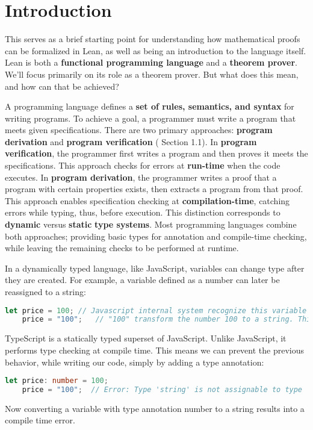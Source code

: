 \section{Introduction}
This serves as a brief starting point for understanding how mathematical proofs can be 
formalized in Lean, as well as being an introduction to the language itself. 
Lean is both a \textbf{functional programming language} and a \textbf{theorem prover}.
We'll focus primarily on its role as a theorem prover. 
But what does this mean, and how can that be achieved?

A programming language defines a \textbf{set of rules, semantics, and syntax} for writing programs. 
To achieve a goal, a programmer must write a program that meets given specifications. 
There are two primary approaches: \textbf{program derivation} and \textbf{program verification} 
(\cite{nordstrom1990programming} Section 1.1).
In \textbf{program verification}, the programmer first writes a program and then proves it meets 
the specifications. This approach checks for errors at \textbf{run-time} when the code executes.
In \textbf{program derivation}, the programmer writes a proof that a program with certain properties exists, 
then extracts a program from that proof. This approach enables specification 
checking at \textbf{compilation-time}, catching errors while typing, thus, before execution.
This distinction corresponds to \textbf{dynamic} versus \textbf{static} \textbf{type systems}. 
Most programming languages combine both approaches; providing basic types for annotation and compile-time checking, 
while leaving the remaining checks to be performed at runtime.

\begin{example}
    In a dynamically typed language, like JavaScript, variables can change type after 
    they are created. For example, a variable defined as a number can later 
    be reassigned to a string:
    \begin{lstlisting}[language=JavaScript]
    let price = 100; // Javascript internal system recognize this variable as a number
    price = "100";   // "100" transform the number 100 to a string. This is valid in JavaScript
    \end{lstlisting}
    TypeScript is a statically typed superset of JavaScript.  
    Unlike JavaScript, it performs type checking at compile time.  
    This means we can prevent the previous behavior, while writing our code, simply by adding 
    a type annotation:
    \begin{lstlisting}[language=TypeScript]
    let price: number = 100;
    price = "100";  // Error: Type 'string' is not assignable to type 'number'
    \end{lstlisting} 
    Now converting a variable with type annotation number to a string results into a compile time error.
\end{example}

